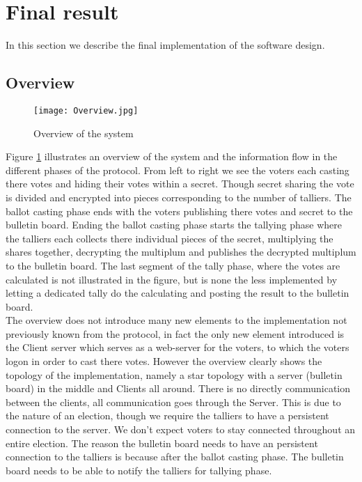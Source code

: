 \section{Final result}
In this section we describe the final implementation of the software design. 

\subsection{Overview}

\begin{figure}[H]
    \centering
    \texttt{[image: Overview.jpg]}
    \caption{Overview of the system}
    \label{fig:informal_overview}
\end{figure}

Figure \ref{fig:informal_overview} illustrates an overview of the system and the information flow in the different phases of the protocol. From left to right we see the voters each casting there votes and hiding their votes within a secret. Though secret sharing the vote is divided and encrypted into pieces corresponding to the number of talliers. The ballot casting phase ends with the voters publishing there votes and secret to the bulletin board. Ending the ballot casting phase starts the tallying phase where the talliers each collects there individual pieces of the secret, multiplying the shares together, decrypting the multiplum and publishes the decrypted multiplum to the bulletin board. The last segment of the tally phase, where the votes are calculated is not illustrated in the figure, but is none the less implemented by letting a dedicated tally do the calculating and posting the result to the bulletin board. \\

\noindent
The overview does not introduce many new elements to the implementation not previously known from the protocol, in fact the only new element introduced is the Client server which serves as a web-server for the voters, to which the voters logon in order to cast there votes. However the overview clearly shows the topology of the implementation, namely a star topology with a server (bulletin board) in the middle and Clients all around. There is no directly communication between the clients, all communication goes through the Server. This is due to the nature of an election, though we require the talliers to have a persistent connection to the server. We don't expect voters to stay connected throughout an entire election. The reason the bulletin board needs to have an persistent connection to the talliers is because after the ballot casting phase. The bulletin board needs to be able to notify the talliers for tallying phase.

